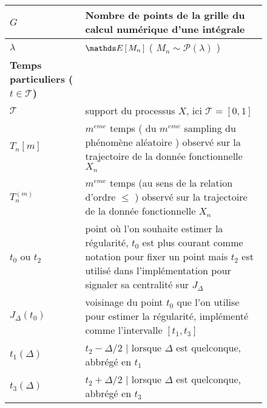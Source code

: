 \begin{figure}[H]
\begin{tabularx}{\textwidth}{lX}
		$G$               & Nombre de points de la grille du calcul numérique d'une intégrale                                                                                                                               \\
		\midrule
		$\lambda$         & $\esperance{M_n}$ ( $M_n \sim \mathcal P(\lambda)$ )                                                                                                                                            \\
		\midrule
		\textbf{Temps particuliers ($t \in \mathcal T$)}                                                                                                                                                                    \\
		\midrule
		$\mathcal T$      & support du processus $X$, ici $\mathcal T = [0,1]$                                                                                                                                              \\
		$T_n[m]$          & $m^{eme}$ temps ( du $m^{eme}$ sampling du phénomène aléatoire ) observé sur la trajectoire de la donnée fonctionnelle $X_n$                                                                    \\
		$T_n^{(m)}$       & $m^{eme}$ temps (au sens de la relation d'ordre $\leq$ ) observé sur la trajectoire de la donnée fonctionnelle $X_n$                                                                            \\
		$t_0$ ou $t_2$    & point où l'on souhaite estimer la régularité, $t_0$ est plus courant comme notation pour fixer un point mais $t_2$ est utilisé dans l'implémentation pour signaler sa centralité sur $J_\Delta$ \\
		$J_\Delta(t_0)$   & \og voisinage \fg du point $t_0$ que l'on utilise pour estimer la régularité, implémenté comme l'intervalle $[t_1, t_3]$                                                                        \\
		$t_1(\Delta)$     & $t_2 - \Delta/2$ | lorsque $\Delta$ est quelconque, abbrégé en $t_1$                                                                                                                            \\
		$t_3(\Delta)$     & $t_2 + \Delta/2$ | lorsque $\Delta$ est quelconque, abbrégé en $t_3$                                                                                                                            \\

\end{tabularx}
\end{figure}
